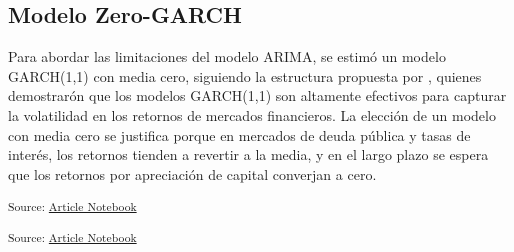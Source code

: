 \documentclass[
  number,
  preprint,
  3p,
  onecolumn]{elsarticle}
\begin{document}
\subsection{Modelo Zero-GARCH}\label{modelo-zero-garch}

Para abordar las limitaciones del modelo ARIMA, se estimó un modelo
GARCH(1,1) con media cero, siguiendo la estructura propuesta por
\citep{miah_rahman_2016}, quienes demostrarón que los modelos GARCH(1,1)
son altamente efectivos para capturar la volatilidad en los retornos de
mercados financieros. La elección de un modelo con media cero se
justifica porque en mercados de deuda pública y tasas de interés, los
retornos tienden a revertir a la media, y en el largo plazo se espera
que los retornos por apreciación de capital converjan a cero.
\citep{fabozzi_fixed_income}

\textsubscript{Source:
\href{https://iancont.github.io/fixed_income_garch/index-preview.html}{Article
Notebook}}

\label{garch-model-fitting}
\textsubscript{Source:
\href{https://iancont.github.io/fixed_income_garch/index-preview.html}{Article
Notebook}}
\end{document}
